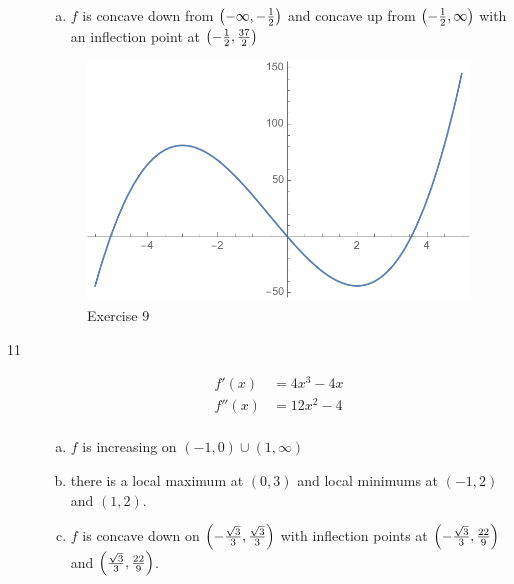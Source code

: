 \documentclass[letterpaper, landscape]{exam}
\begin{document}
\begin{description}
\begin{enumerate}[(a)]
        \item $f$ is concave down from $\del{ -\infty, - \frac{1}{2} }$ and 
          concave up from $\del{ - \frac{1}{2}, \infty }$ with an
          inflection point at $\del{ -\frac{1}{2}, \frac{37}{2} }$
      \end{enumerate}

      \begin{figure}[H]
        \centering
        \includegraphics[scale = 0.6]{ex09.pdf}
        \caption{Exercise 9}
        \label{fig:ex09}
      \end{figure}
      
    \newpage

    \item[11]
      \begin{align*}
        f'(x)  & = 4x^3 - 4x \\
        f''(x) & = 12x^2 - 4 \\
      \end{align*}

      \begin{enumerate}[(a)]
        \item $f$ is increasing on $(-1, 0) \cup (1, \infty)$

        \item there is a local maximum at $(0, 3)$ and local minimums at
          $(-1, 2)$ and $(1, 2)$.

        \item $f$ is concave down on $\del{ -\frac{\sqrt{3}}{3}, \frac{\sqrt{3}}{3} }$ with
          inflection points at $\del{ -\frac{\sqrt{3}}{3}, \frac{22}{9} }$ and
          $\del{ \frac{\sqrt{3}}{3}, \frac{22}{9} }$.

      \end{enumerate}


\end{description}
\end{document}
